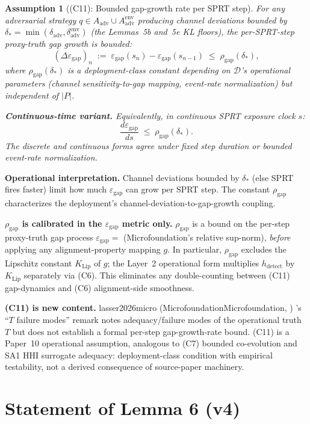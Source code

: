 \documentclass{article}
\makeatletter
\newcommand{\citep}[2][]{%
  \begingroup
  \def\@tmpkey{#2}%
  \ifx\@tmpkey\@empty\else
    (\ifx\@empty#1\@empty\else #1, \fi
     \@nameuse{bibkey@\@tmpkey})%
  \fi
  \endgroup
}
\newtheorem{assumption}{Assumption}
\newcommand{\Aadv}{A_{\mathrm{adv}}}
\newcommand{\deltaadv}{\delta_{\mathrm{adv}}}
\newcommand{\deltastar}{\delta_{*}}
\newcommand{\rhogap}{\rho_{\mathrm{gap}}}
\newcommand{\epsgap}{\varepsilon_{\mathrm{gap}}}
\makeatother
\begin{document}
\begin{assumption}[(C11): Bounded gap-growth rate per SPRT step]
\label{ass:C11}
For any adversarial strategy $q \in \Aadv \cup
\Aadv^{\mathrm{env}}$ producing channel deviations bounded by
$\deltastar = \min(\deltaadv, \delta_{\mathrm{adv}}^{\mathrm{env}})$
(the Lemmas~5b and~5e KL floors), the per-SPRT-step proxy-truth
gap growth is bounded:
\[
  (\Delta \epsgap)_n \;:=\; \epsgap(s_n) - \epsgap(s_{n-1}) \;\leq\;
  \rhogap(\deltastar),
\]
where $\rhogap(\deltastar)$ is a deployment-class constant
depending on $\mathcal{D}$'s operational parameters (channel
sensitivity-to-gap mapping, event-rate normalization) but
independent of $|P|$.

\textbf{Continuous-time variant.}  Equivalently, in continuous
SPRT exposure clock $s$:
\[
  \frac{d \epsgap}{ds} \;\leq\; \rhogap(\deltastar).
\]
The discrete and continuous forms agree under fixed step duration
or bounded event-rate normalization.
\end{assumption}

\textbf{Operational interpretation.}  Channel deviations bounded by
$\deltastar$ (else SPRT fires faster) limit how much $\epsgap$ can
grow per SPRT step.  The constant $\rhogap$ characterizes the
deployment's channel-deviation-to-gap-growth coupling.

\textbf{$\rhogap$ is calibrated in the $\epsgap$ metric only.}
$\rhogap$ is a bound on the per-step proxy-truth gap process
$\epsgap = $ (Microfoundation's relative sup-norm), \emph{before}
applying any alignment-property mapping $g$.  In particular,
$\rhogap$ excludes the Lipschitz constant $K_{\mathrm{Lip}}$ of $g$;
the Layer~2 operational form multiplies $h_{\mathrm{detect}}$ by
$K_{\mathrm{Lip}}$ separately via (C6).  This eliminates any
double-counting between (C11) gap-dynamics and (C6) alignment-side
smoothness.

\textbf{(C11) is new content.}  \citep[Microfoundation]{lasser2026micro}'s
``$T$ failure modes'' remark notes adequacy/failure modes of the
operational truth $T$ but does not establish a formal per-step
gap-growth-rate bound.  (C11) is a Paper~10 operational assumption,
analogous to (C7) bounded co-evolution and SA1 HHI surrogate
adequacy: deployment-class condition with empirical testability,
not a derived consequence of source-paper machinery.

\section{Statement of Lemma 6 (v4)}
\end{document}
